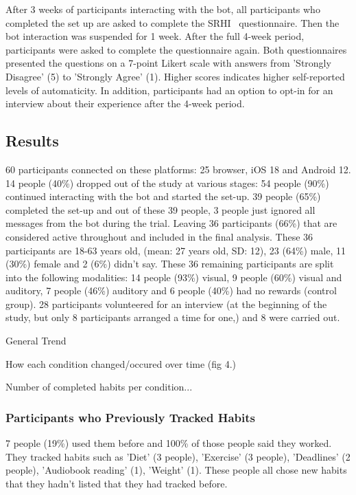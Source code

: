 \documentclass{scaffold/sigchi}
\begin{document}
After 3 weeks of participants interacting with the bot, all participants who completed the set up are asked to complete the SRHI~\cite{article_habit_strength} questionnaire. Then the bot interaction was suspended for 1 week. After the full 4-week period, participants were asked to complete the questionnaire again. Both questionnaires presented the questions on a 7-point Likert scale with answers from 'Strongly Disagree' (5) to 'Strongly Agree' (1). Higher scores indicates higher self-reported levels of automaticity. In addition, participants had an option to opt-in for an interview about their experience after the 4-week period.

\subsection{Results}
60 participants connected on these platforms: 25 browser, iOS 18 and Android 12. 14 people (40\%) dropped out of the study at various stages: 54 people (90\%) continued interacting with the bot and started the set-up. 39 people (65\%) completed the set-up and out of these 39 people, 3 people just ignored all messages from the bot during the trial. Leaving 36 participants (66\%) that are considered active throughout and included in the final analysis. These 36 participants are 18-63 years old, (mean: 27 years old, SD: 12), 23 (64\%) male, 11 (30\%) female and 2 (6\%) didn't say. These 36 remaining participants are split into the following modalities: 14 people (93\%) visual, 9 people (60\%) visual and auditory, 7 people (46\%) auditory and 6 people (40\%) had no rewards (control group). 28 participants volunteered for an interview (at the beginning of the study, but only 8 participants arranged a time for one,) and 8 were carried out.

General Trend

How each condition changed/occured over time (fig 4.)

Number of completed habits per condition...

\subsubsection{Participants who Previously Tracked Habits}
7 people (19\%) used them before and 100\% of those people said they worked. They tracked habits such as 'Diet' (3 people), 'Exercise' (3 people), 'Deadlines' (2 people), 'Audiobook reading' (1), 'Weight' (1). These people all chose new habits that they hadn't listed that they had tracked before.
\end{document}
